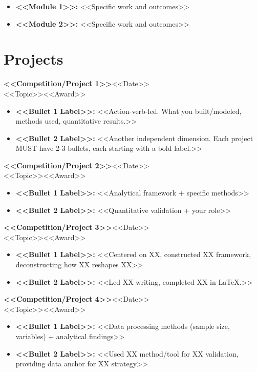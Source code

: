 \documentclass[a4paper, 10pt]{article}
\newcommand{\workentry}[4]{%
  \noindent\textbf{#1}\hfill{\small #2}\\[-2pt]
  {\small #3}\hfill{\small #4}\par\vspace{1.5pt}%
}
\begin{document}
\begin{itemize}
  \item \textbf{<<Module 1>>:} <<Specific work and outcomes>>
  \item \textbf{<<Module 2>>:} <<Specific work and outcomes>>
\end{itemize}

\section{Projects}

\workentry{<<Competition/Project 1>>}{<<Date>>}{<<Topic>>}{<<Award>>}
\begin{itemize}
  \item \textbf{<<Bullet 1 Label>>:} <<Action-verb-led. What you built/modeled, methods used, quantitative results.>>
  \item \textbf{<<Bullet 2 Label>>:} <<Another independent dimension. Each project MUST have 2-3 bullets, each starting with a bold label.>>
\end{itemize}

\workentry{<<Competition/Project 2>>}{<<Date>>}{<<Topic>>}{<<Award>>}
\begin{itemize}
  \item \textbf{<<Bullet 1 Label>>:} <<Analytical framework + specific methods>>
  \item \textbf{<<Bullet 2 Label>>:} <<Quantitative validation + your role>>
\end{itemize}

\workentry{<<Competition/Project 3>>}{<<Date>>}{<<Topic>>}{<<Award>>}
\begin{itemize}
  \item \textbf{<<Bullet 1 Label>>:} <<Centered on XX, constructed XX framework, deconstructing how XX reshapes XX>>
  \item \textbf{<<Bullet 2 Label>>:} <<Led XX writing, completed XX in \LaTeX{}.>>
\end{itemize}

\workentry{<<Competition/Project 4>>}{<<Date>>}{<<Topic>>}{<<Award>>}
\begin{itemize}
  \item \textbf{<<Bullet 1 Label>>:} <<Data processing methods (sample size, variables) + analytical findings>>
  \item \textbf{<<Bullet 2 Label>>:} <<Used XX method/tool for XX validation, providing data anchor for XX strategy>>
\end{itemize}
\end{document}
